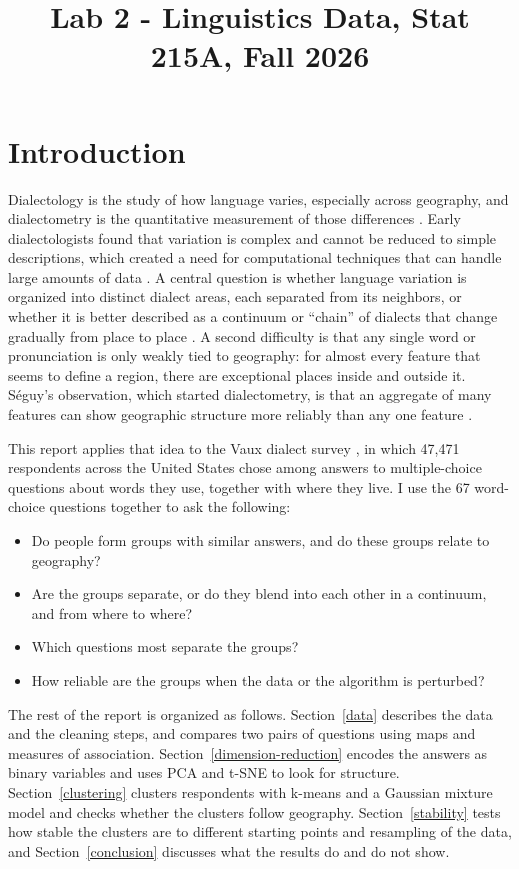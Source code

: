 \documentclass[10pt,letterpaper]{article}
\title{Lab 2 - Linguistics Data, Stat 215A, Fall 2026\vspace{-2em}}
\date{}
\begin{document}
\maketitle

\section{Introduction}\label{introduction}

Dialectology is the study of how language varies, especially across geography, and dialectometry is the quantitative measurement of those differences \cite{nk2003}. Early dialectologists found that variation is complex and cannot be reduced to simple descriptions, which created a need for computational techniques that can handle large amounts of data \cite{nk2003}. A central question is whether language variation is organized into distinct dialect areas, each separated from its neighbors, or whether it is better described as a continuum or ``chain'' of dialects that change gradually from place to place \cite{nk2003}. A second difficulty is that any single word or pronunciation is only weakly tied to geography: for almost every feature that seems to define a region, there are exceptional places inside and outside it. Séguy's observation, which started dialectometry, is that an aggregate of many features can show geographic structure more reliably than any one feature \cite{nk2006}.

This report applies that idea to the Vaux dialect survey \cite{vaux}, in which 47{,}471 respondents across the United States chose among answers to multiple-choice questions about words they use, together with where they live. I use the 67 word-choice questions together to ask the following:
\begin{itemize}
\item Do people form groups with similar answers, and do these groups relate to geography?
\item Are the groups separate, or do they blend into each other in a continuum, and from where to where?
\item Which questions most separate the groups?
\item How reliable are the groups when the data or the algorithm is perturbed?
\end{itemize}

The rest of the report is organized as follows. Section~\ref{data} describes the data and the cleaning steps, and compares two pairs of questions using maps and measures of association. Section~\ref{dimension-reduction} encodes the answers as binary variables and uses PCA and t-SNE to look for structure. Section~\ref{clustering} clusters respondents with k-means and a Gaussian mixture model and checks whether the clusters follow geography. Section~\ref{stability} tests how stable the clusters are to different starting points and resampling of the data, and Section~\ref{conclusion} discusses what the results do and do not show.
\end{document}
